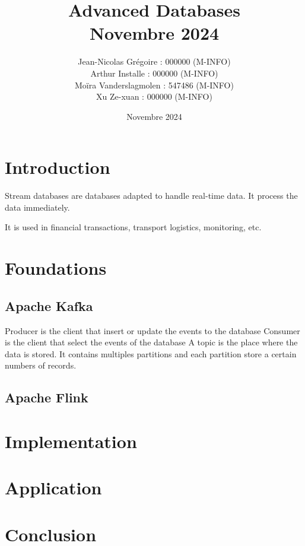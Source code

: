 \documentclass[journal, a4paper]{IEEEtran}
\begin{document}
\title{Advanced Databases \\\vspace*{20pt} \normalsize Novembre 2024}
\author{Jean-Nicolas Grégoire : 000000 (M-INFO) \\
        Arthur Installe : 000000 (M-INFO) \\
        Moïra Vanderslagmolen : 547486 (M-INFO) \\
        Xu Ze-xuan : 000000 (M-INFO)
        }
\date{Novembre 2024}
\maketitle


\section{Introduction}

Stream databases are databases adapted to handle real-time data. It process the data immediately.

It is used in financial transactions, transport logistics, monitoring, etc.

\section{Foundations}

\subsection{Apache Kafka}
Producer is the client that insert or update the events to the database
Consumer is the client that select the events of the database
A topic is the place where the data is stored. It contains multiples partitions and each partition store a certain numbers of records.

\subsection{Apache Flink}


\section{Implementation}

\section{Application}

\section{Conclusion}
\end{document}
